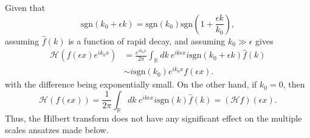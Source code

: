 \documentclass[a4paper,11pt]{article}
\begin{document}
Given that 
\[
\mbox{sgn}(k_{0} + \epsilon k) = \mbox{sgn}(k_{0})\mbox{sgn}\left( 1 + \frac{\epsilon k}{k_{0}}\right),
\] 
assuming $\hat{f}(k)$ is a function of rapid decay,  and assuming $k_{0}\gg \epsilon$ gives 
\begin{align}
\mathcal{H}\left( f(\epsilon x) e^{ik_{0}x} \right)& =
\frac{e^{ik_{0}x}}{2\pi}\int_{\mathbb{R}}dk~ e^{ik\epsilon x}
i\mbox{sgn}(k_{0}+\epsilon k) \hat{f}(k)\nonumber \\ & \sim i\mbox{sgn}(k_{0})e^{ik_{0}x}f(\epsilon x).\nonumber
\end{align}
with the difference being exponentially small.  On the other hand, if $k_{0}=0$, then 
\[
\mathcal{H}\left( f(\epsilon x) \right) = \frac{1}{2\pi}\int_{\mathbb{R}}dk~ e^{ik\epsilon x}  i\mbox{sgn}(k) \hat{f}(k) = (\mathcal{H}f)(\epsilon x). 
\]
Thus, the Hilbert transform does not have any significant effect on the multiple scales ansatzes made below.  
\end{document}
